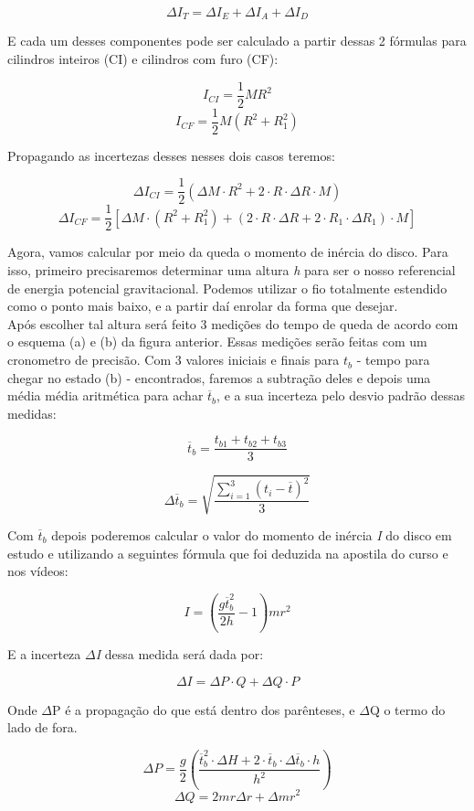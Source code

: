 \[\Delta I_T = \Delta I_E + \Delta I_A + \Delta I_D\]

E cada um desses componentes pode ser calculado a partir dessas 2 fórmulas para cilindros inteiros (CI) e cilindros com furo (CF):

\[I_{CI} = \frac{1}{2}MR^2\]
\[I_{CF} = \frac{1}{2}M(R^2 + R_1^2)\]

Propagando as incertezas desses nesses dois casos teremos:

\[\Delta I_{CI} = \frac{1}{2} \left( \Delta M \cdot R^2 + 2 \cdot R \cdot \Delta R \cdot M \right)\]
\[\Delta I_{CF} = \frac{1}{2} 
    \left[ 
        \Delta M \cdot (R^2 + R_1^2) + 
        \left( 2 \cdot R \cdot \Delta R + 2 \cdot R_1 \cdot \Delta R_1 \right) \cdot M
    \right]
\]

Agora, vamos calcular por meio da queda o momento de inércia do disco. Para isso, primeiro precisaremos determinar uma altura \textit{h} para ser o nosso referencial de energia potencial gravitacional. Podemos utilizar o fio totalmente estendido como o ponto mais baixo, e a partir daí enrolar da forma que desejar.\\

Após escolher tal altura será feito 3 medições do tempo de queda de acordo com o esquema (a) e (b) da figura anterior. Essas medições serão feitas com um cronometro de precisão. Com 3 valores iniciais e finais para \textit{$t_b$} - tempo para chegar no estado (b) - encontrados, faremos a subtração deles e depois uma média média aritmética para achar $\overline{t}_b$, e a sua incerteza pelo desvio padrão dessas medidas:

\[\overline{t}_b = \frac{t_{b1} + t_{b2} + t_{b3}}{3}\]

\[\Delta \overline{t}_b = \sqrt{\frac{\sum_{i=1}^{3} (t_i - \overline{t})^2}{3}}\]

Com $\overline{t}_b$ depois poderemos calcular o valor do momento de inércia \textit{I} do disco em estudo e utilizando a seguintes fórmula que foi deduzida na apostila do curso e nos vídeos:

\[I = \left( \frac{g \overline{t}_b^2}{2h} - 1 \right) mr^2\]

E a incerteza \textit{$\Delta$I} dessa medida será dada por:

\[\Delta I = \Delta P \cdot Q + \Delta Q \cdot P\]

Onde $\Delta$P é a propagação do que está dentro dos parênteses, e $\Delta$Q o termo do lado de fora.

\[
    \Delta P = \frac{g}{2} 
    \left( 
        \frac
        {\overline{t}_b^2 \cdot \Delta H + 2 \cdot \overline{t}_b \cdot \Delta \overline{t}_b \cdot h}
        {h^2} 
    \right)
\]
\[\Delta Q = 2mr \Delta r + \Delta m r^2\]

